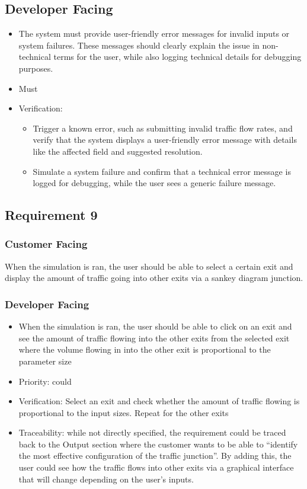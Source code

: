 \documentclass{article}
\begin{document}
\subsection{Developer Facing}
\begin{itemize}
  \item The system must provide user-friendly error messages for invalid inputs or system failures. These messages should clearly explain the issue in
  non-technical terms for the user, while also logging technical details for debugging purposes.
  \item Must
  \item Verification: 
  \begin{itemize}
      \item Trigger a known error, such as submitting invalid traffic flow rates, and verify that the system displays a user-friendly error message with
      details like the affected field and suggested resolution.
      \item Simulate a system failure and confirm that a technical error message is logged for debugging, while the user sees a generic failure message.
  \end{itemize}
\end{itemize}

\subsection{Requirement 9}
\subsubsection{Customer Facing}
When the simulation is ran, the user should be able to select a certain exit and display the amount of traffic going into other exits via a sankey diagram junction.
\subsubsection{Developer Facing}
\begin{itemize}
  \item When the simulation is ran, the user should be able to click on an exit and see the amount of traffic flowing into the other exits from the selected exit where the volume flowing in into the other exit is proportional to the parameter size
  \item Priority: could
  \item Verification: Select an exit and check whether the amount of traffic flowing is proportional to the input sizes. Repeat for the other exits
  \item Traceability: while not directly specified, the requirement could be traced back to the Output section where the customer wants to be able to “identify the most effective configuration of the traffic junction”. By adding this, the user could see how the traffic flows into other exits via a graphical interface that will change depending on the user's inputs.
\end{itemize}
\end{document}
